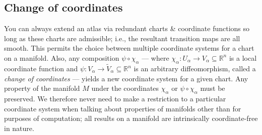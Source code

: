 \documentclass[a4paper]{article}
\newcommand{\R}{\mathbb{R}}
\begin{document}
\subsection{Change of coordinates}

You can always extend an atlas via redundant charts \& coordinate functions so long as these charts are admissible; i.e., the resultant transition maps are all smooth. This permits the choice between multiple coordinate systems for a chart on a manifold. Also, any composition $\psi \circ \chi_\alpha$ --- where $\chi_\alpha : U_\alpha \to V_\alpha \subseteq \R^n$ is a local coordinate function and $\psi : V_\alpha \to \tilde{V}_\alpha \subseteq \R^n$ is an arbitrary diffeomorphism, called a \emph{change of coordinates} --- yields a new coordinate system for a given chart. Any property of the manifold $M$ under the coordinates $\chi_\alpha$ or $\psi \circ \chi_\alpha$ must be preserved. We therefore never need to make a restriction to a particular coordinate system when talking about properties of manifolds other than for purposes of computation; all results on a manifold are intrinsically coordinate-free in nature. 
\end{document}
